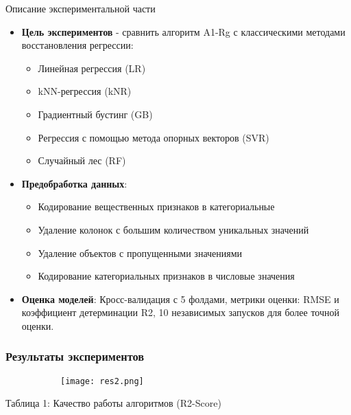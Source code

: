 \documentclass[10pt,pdf,unicode,aspectratio=169]{beamer}
\begin{document}
\begin{frame}{Описание экспериментальной части}

\begin{itemize}
    \item \textbf{Цель экспериментов} - сравнить алгоритм A1-Rg с классическими методами восстановления регрессии:
    \begin{itemize}
        \item Линейная регрессия (LR)
        \item kNN-регрессия (kNR)
        \item Градиентный бустинг (GB)
        \item Регрессия с помощью метода опорных векторов (SVR)
        \item Случайный лес (RF)
    \end{itemize}
    \item \textbf{Предобработка данных}:
    \begin{itemize}
        \item Кодирование вещественных признаков в категориальные
        \item Удаление колонок с большим количеством уникальных значений
        \item Удаление объектов с пропущенными значениями
        \item Кодирование категориальных признаков в числовые значения
    \end{itemize}
    \item \textbf{Оценка моделей}:
    Кросс-валидация с 5 фолдами,
    метрики оценки: RMSE и коэффициент детерминации R2,
    10 независимых запусков для более точной оценки.
\end{itemize}

\end{frame}



\begin{frame}
\frametitle{Результаты экспериментов}
\begin{figure}
                \centering
                \begin{subfigure}{\textwidth}
                    \texttt{[image: res2.png]}
                \end{subfigure}
\end{figure}
                Таблица 1: Качество работы алгоритмов (R2-Score)

\end{frame}
\end{document}
